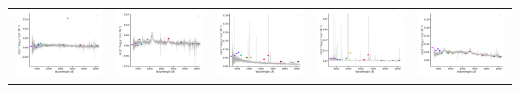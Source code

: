\begin{center}
\begin{longtable}{l l l l l }
    \includegraphics[width=0.19\linewidth, clip]{Figs/Figs-sdss/spec-4037-55631-0460-SPLUS-n02s44-029163.pdf} & \includegraphics[width=0.19\linewidth, clip]{Figs/Figs-sdss/spec-4220-55447-0004-STRIPE82-0013-055791.pdf} & \includegraphics[width=0.19\linewidth, clip]{Figs/Figs-sdss/spec-4748-55631-0047-SPLUS-n02n25-025655.pdf} & \includegraphics[width=0.19\linewidth, clip]{Figs/Figs-sdss/spec-7822-57041-0278-STRIPE82-0061-047759.pdf} & \includegraphics[width=0.19\linewidth, clip]{Figs/Figs-sdss/spec-9147-58038-0401-SPLUS-s02s08-004413.pdf} \\

\end{longtable}
\end{center}
